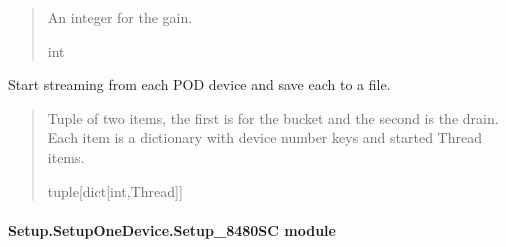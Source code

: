 \documentclass[letterpaper,10pt,english]{sphinxmanual}
\begin{document}
\begin{fulllineitems}
\begin{fulllineitems}
\begin{quote}
\begin{description}
\sphinxAtStartPar
An integer for the gain.

\sphinxAtStartPar
int

\end{description}\end{quote}

\end{fulllineitems}


\begin{fulllineitems}
\label{\detokenize{Setup.SetupOneDevice:Setup.SetupOneDevice.Setup_8401HR.Setup8401HR._StreamThreading}}
\pysigstartsignatures
{}
\pysigstopsignatures
\sphinxAtStartPar
Start streaming from each POD device and save each to a file.
\begin{quote}\begin{description}
\sphinxAtStartPar
Tuple of two items, the first is for the bucket and the second is the drain.                 Each item is a dictionary with device number keys and started Thread items.

\sphinxAtStartPar
tuple{[}dict{[}int,Thread{]}{]}

\end{description}\end{quote}

\end{fulllineitems}


\end{fulllineitems}



\paragraph{Setup.SetupOneDevice.Setup\_8480SC module}
\label{\detokenize{Setup.SetupOneDevice:module-Setup.SetupOneDevice.Setup_8480SC}}\label{\detokenize{Setup.SetupOneDevice:setup-setuponedevice-setup-8480sc-module}}
\end{document}
